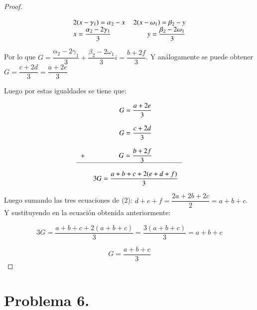 \documentclass[11pt]{article}
\theoremstyle{Tema} \newtheorem{Tema}{Tema} %
\theoremstyle{Tema} \newtheorem{serie}{Serie}              %
\theoremstyle{Tema} \newtheorem{ejercicio}{Ejercicio}    %
\begin{document}
\begin{proof}
\begin{center}
\begin{equation*}
\begin{tabular}{lr}
$2(x-\gamma_1)=\alpha_2-x $& $2(x-\omega_1)=\beta_2-y$\\
$ x=\dfrac{\alpha_2-2\gamma_1}{3} $&  $y=\dfrac{\beta_2-2\omega_1}{3}$\\
\end{tabular} 
\end{equation*}
\end{center}

Por lo que $ G=\dfrac{\alpha_2-2\gamma_1}{3}+ \dfrac{\beta_2-2\omega_1}{3}i= \dfrac{b+2f}{3} $. Y an\'alogamente se puede obtener $ G= \dfrac{c+2d}{3}=\dfrac{a+2e}{3}$


Luego por estas igualdades se tiene que:

\begin{center}
	\begin{equation*}
	\begin{tabular}{lc}
	& $G=\dfrac{a+2e}{3} $\\
	\\  
	 &$G=\dfrac{c+2d}{3} $\\ 
	 \\
	 +&$G=\dfrac{b+2f}{3}$\\
	\hline 
	\\
	 &$3G=\dfrac{a+b+c+2(e+d+f)}{3}$\\
	\end{tabular} 	
	\end{equation*}
	\end{center}

Luego sumando las tres ecuaciones de (2):
$ d+e+f=\dfrac{2a+2b+2c}{2}=a+b+c $. Y sustituyendo en la ecuaci\'on obtenida anteriormente:

\begin{equation*}
3G=\dfrac{a+b+c+2(a+b+c)}{3}=\dfrac{3(a+b+c)}{3}=a+b+c
\end{equation*}


\begin{equation*}
G=\dfrac{a+b+c}{3}
\end{equation*}
\end{proof}
\section*{\textbf{Problema 6.} }
\end{document}
